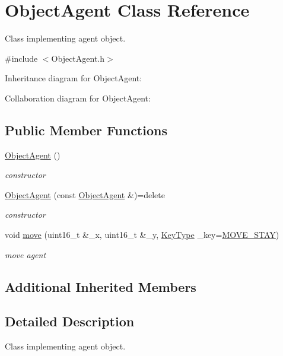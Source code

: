\hypertarget{class_object_agent}{\section{Object\+Agent Class Reference}
\label{class_object_agent}
}


Class implementing agent object.  




{\ttfamily \#include $<$Object\+Agent.\+h$>$}



Inheritance diagram for Object\+Agent\+:


Collaboration diagram for Object\+Agent\+:
\subsection*{Public Member Functions}
\begin{DoxyCompactItemize}
\item 
\hyperlink{class_object_agent_a28e60f99b857e46f67733117bcad9326}{Object\+Agent} ()
\begin{DoxyCompactList}\small\item\em constructor \end{DoxyCompactList}\item 
\hyperlink{class_object_agent_a0a330d7f204e98450725c6ffa76a2e43}{Object\+Agent} (const \hyperlink{class_object_agent}{Object\+Agent} \&)=delete
\begin{DoxyCompactList}\small\item\em constructor \end{DoxyCompactList}\item 
void \hyperlink{class_object_agent_a28bdd89c521b1f33ebbecc5c5a56f9fa}{move} (uint16\+\_\+t \&\+\_\+x, uint16\+\_\+t \&\+\_\+y, \hyperlink{_i_key_type_8h_aab0feaba617470cb4aa830dc5935238c}{Key\+Type} \+\_\+key=\hyperlink{_object_agent_8h_a00ec4eba48da32d6cbdf827185fd3d34a2a255050085b4deedc187c2d8be54d5a}{M\+O\+V\+E\+\_\+\+S\+T\+A\+Y})
\begin{DoxyCompactList}\small\item\em move agent \end{DoxyCompactList}\end{DoxyCompactItemize}
\subsection*{Additional Inherited Members}


\subsection{Detailed Description}
Class implementing agent object. 

